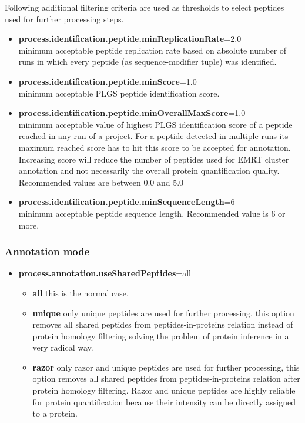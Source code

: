 \documentclass[]{article}
\providecommand{\tightlist}{%
  \setlength{\itemsep}{0pt}\setlength{\parskip}{0pt}}
\begin{document}
Following additional filtering criteria are used as thresholds to select
peptides used for further processing steps.

\begin{itemize}
\tightlist
\item
  \textbf{process.identification.peptide.minReplicationRate}=2.0\\
  minimum acceptable peptide replication rate based on absolute number
  of runs in which every peptide (as sequence-modifier tuple) was
  identified.
\item
  \textbf{process.identification.peptide.minScore}=1.0\\
  minimum acceptable PLGS peptide identification score.
\item
  \textbf{process.identification.peptide.minOverallMaxScore}=1.0\\
  minimum acceptable value of highest PLGS identification score of a
  peptide reached in any run of a project. For a peptide detected in
  multiple runs its maximum reached score has to hit this score to be
  accepted for annotation. Increasing score will reduce the number of
  peptides used for EMRT cluster annotation and not necessarily the
  overall protein quantification quality. Recommended values are between
  0.0 and 5.0
\item
  \textbf{process.identification.peptide.minSequenceLength}=6\\
  minimum acceptable peptide sequence length. Recommended value is 6 or
  more.
\end{itemize}

\subsubsection{Annotation mode}\label{annotation-mode}

\begin{itemize}
\tightlist
\item
  \textbf{process.annotation.useSharedPeptides}=all

  \begin{itemize}
  \tightlist
  \item
    \textbf{all} this is the normal case.
  \item
    \textbf{unique} only unique peptides are used for further
    processing, this option removes all shared peptides from
    peptides-in-proteins relation instead of protein homology filtering
    solving the problem of protein inference in a very radical way.
  \item
    \textbf{razor} only razor and unique peptides are used for further
    processing, this option removes all shared peptides from
    peptides-in-proteins relation after protein homology filtering.
    Razor and unique peptides are highly reliable for protein
    quantification because their intensity can be directly assigned to a
    protein.
  \end{itemize}
\end{itemize}
\end{document}

